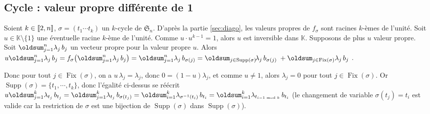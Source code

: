 \documentclass[10pt,a4paper,french,landscape]{article}
\DeclarePairedDelimiter\parenlong{\lparen}{\rparen}
\newcommand{\paren}[1]{\parenlong*{#1}}
\DeclarePairedDelimiter\bracketlong{\llbracket}{\rrbracket}
\newcommand{\br}[1]{\bracketlong*{#1}}
\renewcommand{\sum}{\displaystyle\oldsum}
\theoremstyle{definition}
\theoremstyle{remark}
\DeclareMathOperator{\Fix}{Fix}
\DeclareMathOperator{\Supp}{Supp}
\DeclareMathOperator{\car}{car}
\newcommand{\KK}{\mathbb K}
\newcommand{\Sy}{\mathfrak{S}}
\newcommand{\1}{\mathbbm{1}}
\newcommand{\Sn}[1][n]{\Sy_{#1}}
\begin{document}
\begin{multicols*}{2}
\section{Cycle : valeur propre différente de 1}
\label{sec:cycle-non-1}

Soient $k\in\br{2,n}$, $\sigma=(t_1 \cdots t_k)$ un $k$-cycle de $\Sn$. D'après la partie \ref{sec:diago}, les valeurs propres de $f_\sigma$ sont racines $k$-èmes de l'unité. Soit $u\in\KK\setminus\{1\}$ une éventuelle racine $k$-ème de l'unité. Comme $u\cdot u^{k-1}=1$, alors $u$ est inversible dans $\KK$.
Supposons de plus $u$ valeur propre. Soit $\sum_{j=1}^n \lambda_{j}\, b_{j}$ un vecteur propre pour la valeur propre $u$. Alors
$
u\sum_{j=1}^n \lambda_{j}\, b_{j}
=f_\sigma\paren{\sum_{j=1}^n \lambda_{j}\, b_{j}}
=\sum_{j=1}^n \lambda_{j}\, b_{\sigma(j)}
=\sum_{j\in\Supp(\sigma)}\!\lambda_{j}\, b_{\sigma(j)}\;+\sum_{j\in\Fix(\sigma)} \lambda_{j}\, b_{j}$ .
\medskip

\noindent
Donc pour tout $j\in\Fix(\sigma)$, on a $u\,\lambda_{j}=\lambda_{j}$,
%
donc $0=(1-u)\lambda_{j}$, et comme $u\neq 1$, alors $\lambda_{j}=0$ pour tout $j\in\Fix(\sigma)$.
Or $\Supp(\sigma)=\{t_1, \cdots, t_k\}$, donc l'égalité ci-dessus se réécrit
$
u\sum_{j=1}^k \lambda_{t_j}\, b_{t_j}
=\sum_{j=1}^k \lambda_{t_j}\, b_{\sigma(t_j)}
=\sum_{i=1}^k \lambda_{\sigma^{-1}(t_i)}\, b_{t_i}
=\sum_{i=1}^k \lambda_{t_{i-1\text{ mod }k}}\, b_{t_{i}}
$ (le changement de variable $\sigma(t_j)=t_i$ est valide car la restriction de $\sigma$ est une bijection de $\Supp(\sigma)$ dans $\Supp(\sigma)$).\medskip


\end{multicols*}
\end{document}
